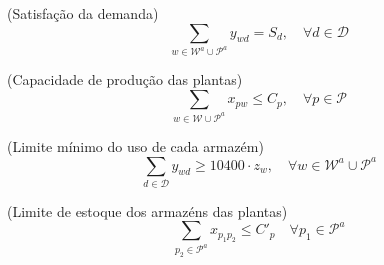 \documentclass[12pt,a4paper]{article}
\begin{document}
\begin{center}
    (Satisfação da demanda)
    \begin{equation}
        \sum_{w \in \mathcal{W}^{a} \cup \mathcal{P}^{a}} y_{wd} =
        S_d, \quad
        \forall d \in \mathcal{D}
    \end{equation}
\end{center}


\begin{center}
    (Capacidade de produção das plantas)
    \begin{equation}
        \sum_{w \in \mathcal{W} \cup \mathcal{P}^{a}} x_{pw} \leq
        C_p, \quad
        \forall p \in \mathcal{P}
    \end{equation}
\end{center}



\begin{center}
    (Limite mínimo do uso de cada armazém)
    \begin{equation}
        \sum_{d \in \mathcal{D}} y_{wd}
        \geq 10400 \cdot z_{w}, \quad
        \forall w \in \mathcal{W}^{a} \cup \mathcal{P}^{a}
    \end{equation}
\end{center}


\begin{center}
    (Limite de estoque dos armazéns das plantas)
    \begin{equation} %
        \sum_{p_2 \in \mathcal{P}^{a}} x_{p_{1}p_{2}} \leq C'_p \quad \forall p_1 \in \mathcal{P}^{a}
    \end{equation}
\end{center}
\end{document}
